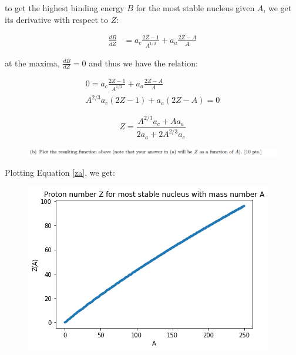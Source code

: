 \documentclass[11pt]{article}
\theoremstyle{definition}
\begin{document}
to get the highest binding energy $B$ for the most stable nucleus given $A$, we get its derivative with respect to $Z$:

\begin{align}
    \frac{dB}{dZ} &= 
        a_c \frac{2Z-1}{A^{1/3}} +a_a \frac{2Z-A}{A}
\end{align}

at the maxima, $\frac{dB}{dZ} = 0$ and thus we have the relation:

\begin{align}
    0 = 
    a_c \frac{2Z-1}{A^{1/3}} +a_a \frac{2Z-A}{A}\\
    A^{2/3}a_c(2Z-1) + a_a(2Z-A) = 0
\end{align}

\begin{equation}\label{za}
\boxed{
    Z = \frac{A^{2/3}a_c + Aa_a}{2a_a + 2A^{2/3}a_c}
}
\end{equation}



\newpage



\begin{figure}[H]
    \centering
    \includegraphics[scale = 0.5]{1b.png}
\end{figure}

Plotting Equation \ref{za}, we get:

\begin{figure}[H]
    \centering
    \includegraphics[scale = 0.75]{Z(A).png}
\end{figure}
\end{document}
